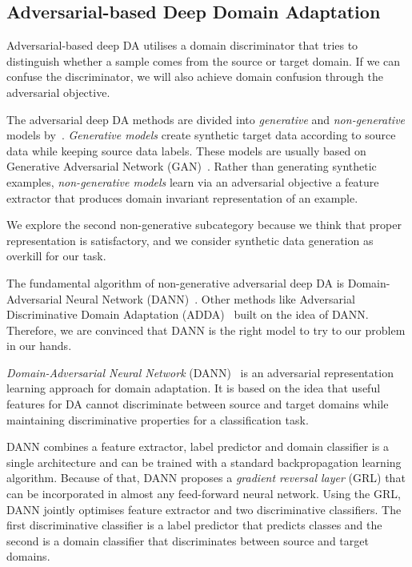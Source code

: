 \subsection{Adversarial-based Deep Domain Adaptation}
\label{adversarial_da}

Adversarial-based deep DA utilises a domain discriminator
that tries to distinguish whether a sample comes from the source or target domain.
If we can confuse the discriminator,
we will also achieve domain confusion through the adversarial objective.

The adversarial deep DA methods are divided into \textit{generative} and \textit{non-generative} models by~\cite{wang2018}.
\textit{Generative models} create synthetic target data according to source data while keeping source data labels.
These models are usually based on Generative Adversarial Network (GAN)~\cite{goodfellow2014}.
Rather than generating synthetic examples,
\textit{non-generative models} learn via an adversarial objective a feature extractor
that produces domain invariant representation of an example.

We explore the second non-generative subcategory
because we think that proper representation is satisfactory,
and we consider synthetic data generation as overkill for our task.

The fundamental algorithm of non-generative adversarial deep DA is
Domain-Adversarial Neural Network (DANN)~\cite{ganin2016}.
Other methods like Adversarial Discriminative Domain Adaptation (ADDA)~\cite{tzeng2017} built on the idea of DANN.
Therefore, we are convinced that DANN is the right model to try to our problem in our hands.

\textit{Domain-Adversarial Neural Network} (DANN)~\cite{ganin2016} is an adversarial representation learning approach for domain adaptation.
It is based on the idea that useful features for DA
cannot discriminate between source and target domains
while maintaining discriminative properties for a classification task.

DANN combines a feature extractor, label predictor and domain classifier is a single architecture
and can be trained with a standard backpropagation learning algorithm.
Because of that, DANN proposes a \textit{gradient reversal layer} (GRL)
that can be incorporated in almost any feed-forward neural network.
Using the GRL, DANN jointly optimises feature extractor and two discriminative classifiers.
The first discriminative classifier is a label predictor that predicts classes and the second is a domain classifier
that discriminates between source and target domains.

